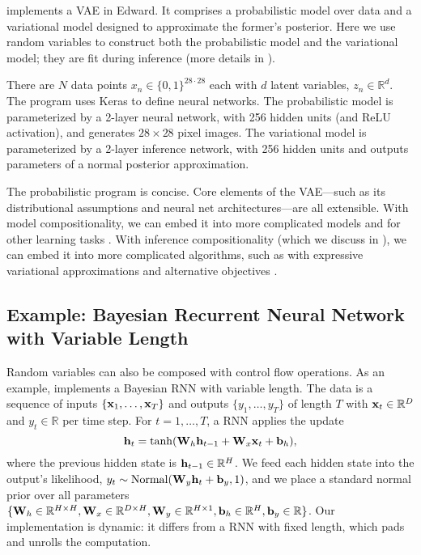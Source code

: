  implements a \gls{VAE}
\citep{kingma2014autoencoding,rezende2014stochastic} in Edward. It
comprises a probabilistic model over data and a variational model
designed to approximate the former's posterior.
Here we use random variables to construct both
the probabilistic model and the variational model; they are fit
during inference (more details in ).

There are $N$ data points $x_n\in\{0,1\}^{28\cdot 28}$ each with
$d$ latent variables, $z_n\in\mathbb{R}^d$. The program uses Keras
\citep{chollet2015keras} to define neural networks. The
probabilistic model is parameterized by a 2-layer neural network, with
256 hidden units (and ReLU activation), and generates
$28\times 28$ pixel images. The variational model is parameterized by
a 2-layer inference network, with 256 hidden units and
outputs parameters of a normal posterior approximation.

The probabilistic program is concise. Core elements of the
\gls{VAE}---such as its distributional assumptions and neural net
architectures---are all extensible. With model compositionality, we
can embed it into more complicated models
\citep{gregor2015draw,rezende2016one} and for other learning tasks
\citep{kingma2014semi}. With inference compositionality (which we
discuss in ), we can embed it into more complicated algorithms, such
as with expressive variational approximations
\citep{rezende2015variational,tran2016variational,kingma2016improving}
and alternative objectives
\citep{ranganath2016operator,li2016variational,dieng2016chi}.

\subsection{\hspace{-0.225em}Example: Bayesian Recurrent Neural Network with Variable Length}

Random variables can also be composed with control flow operations.
As an example,  implements a Bayesian \gls{RNN} with
variable length.
The data is a sequence of inputs $\{\boldsymbol{\mathbf{x}}_1,\ldots,\boldsymbol{\mathbf{x}}_T\}$ and
outputs $\{y_1,\ldots,y_T\}$ of length $T$ with
$\boldsymbol{\mathbf{x}}_t\in\mathbb{R}^{D}$ and $y_t\in\mathbb{R}$ per time step.
For $t=1,\ldots,T$,
a \gls{RNN} applies the update
\begin{equation*}
  \boldsymbol{\mathbf{h}}_t = \operatorname{tanh}(\boldsymbol{\mathbf{W}}_h \boldsymbol{\mathbf{h}}_{t-1} + \boldsymbol{\mathbf{W}}_x \boldsymbol{\mathbf{x}}_t + \boldsymbol{\mathbf{b}}_h),
\end{equation*}
where the previous hidden state is
$\boldsymbol{\mathbf{h}}_{t-1}\in\mathbb{R}^H$.
We feed each hidden state into the output's likelihood,
$y_t \sim \operatorname{Normal}(\boldsymbol{\mathbf{W}}_y \boldsymbol{\mathbf{h}}_t + \boldsymbol{\mathbf{b}}_y, 1)$, and
we place a standard normal prior over all parameters
$\{\boldsymbol{\mathbf{W}}_h\in\mathbb{R}^{H\times H}, \boldsymbol{\mathbf{W}}_x\in\mathbb{R}^{D\times H},
\boldsymbol{\mathbf{W}}_y\in\mathbb{R}^{H\times 1},
\boldsymbol{\mathbf{b}}_h\in\mathbb{R}^H,\boldsymbol{\mathbf{b}}_y\in\mathbb{R}\}$. Our implementation is
dynamic: it differs from a \gls{RNN} with fixed length, which
pads and unrolls the computation.

